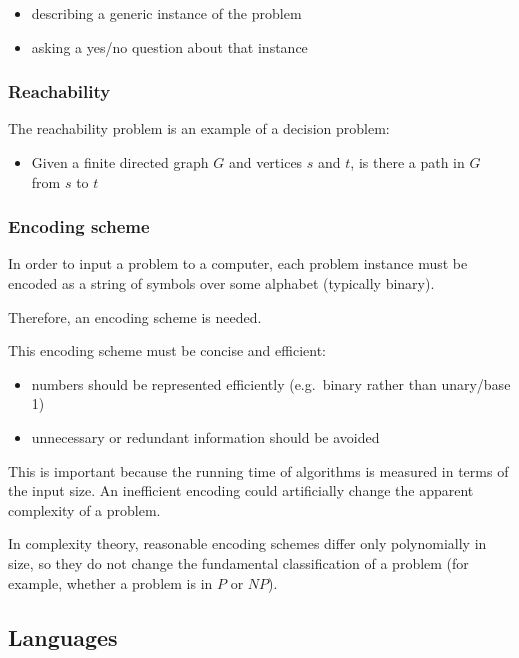 \documentclass[11pt]{article}
\providecommand{\tightlist}{%
      \setlength{\itemsep}{0pt}\setlength{\parskip}{0pt}}
\begin{document}
\begin{itemize}
\tightlist
\item
  describing a generic instance of the problem
\item
  asking a yes/no question about that instance
\end{itemize}

\subsubsection{Reachability}\label{reachability}

The reachability problem is an example of a decision problem:

\begin{itemize}
\tightlist
\item
  Given a finite directed graph \(G\) and vertices \(s\) and \(t\), is
  there a path in \(G\) from \(s\) to \(t\)
\end{itemize}

\subsubsection{Encoding scheme}\label{encoding-scheme}

In order to input a problem to a computer, each problem instance must be
encoded as a string of symbols over some alphabet (typically binary).

Therefore, an encoding scheme is needed.

This encoding scheme must be concise and efficient:

\begin{itemize}
\tightlist
\item
  numbers should be represented efficiently (e.g.~binary rather than
  unary/base 1)
\item
  unnecessary or redundant information should be avoided
\end{itemize}

This is important because the running time of algorithms is measured in
terms of the input size. An inefficient encoding could artificially
change the apparent complexity of a problem.

In complexity theory, reasonable encoding schemes differ only
polynomially in size, so they do not change the fundamental
classification of a problem (for example, whether a problem is in \(P\)
or \(NP\)).

    \subsection{Languages}\label{languages}
\end{document}

